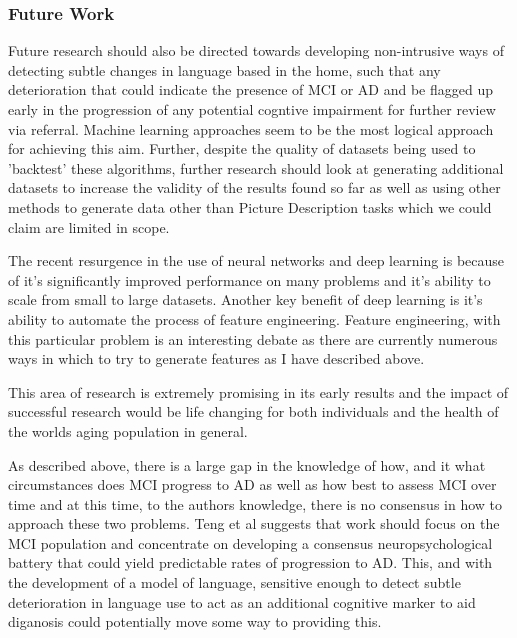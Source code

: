 \documentclass{article}
\begin{document}
\subsubsection{Future Work}
Future research should also be directed towards developing non-intrusive ways of detecting subtle changes in language based in the home, such that any deterioration that could indicate the presence of MCI or AD and be flagged up early in the progression of any potential cogntive impairment for further review via referral. Machine learning approaches seem to be the most logical approach for achieving this aim. Further, despite the quality of datasets being used to 'backtest' these algorithms, further research should look at generating additional datasets to increase the validity of the results found so far as well as using other methods to generate data other than Picture Description tasks which we could claim are limited in scope.
\par
The recent resurgence in the use of neural networks and deep learning is because of it's significantly improved performance on many problems and it's ability to scale from small to large datasets. Another key benefit of deep learning is it's ability to automate the process of feature engineering. Feature engineering, with this particular problem is an interesting debate as there are currently numerous ways in which to try to generate features as I have described above.
\par
This area of research is extremely promising in its early results and the impact of successful research would be life changing for both individuals and the health of the worlds aging population in general.
\par 
As described above, there is a large gap in the knowledge of how, and it what circumstances does MCI progress to AD as well as how best to assess MCI over time and at this time, to the authors knowledge, there is no consensus in how to approach these two problems. Teng et al suggests that work should focus on the MCI population and concentrate on developing a consensus neuropsychological battery that could yield predictable rates of progression to AD. This, and with the development of a model of language, sensitive enough to detect subtle deterioration in language use to act as an additional cognitive marker to aid diganosis could potentially move some way to providing this.
\par 
\end{document}
